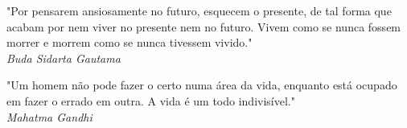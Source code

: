 \begin{titlepage}
 \vspace*{5cm}
 \begin{flushright}
  "Por pensarem ansiosamente no futuro, esquecem o presente, de tal forma que acabam por nem viver no presente nem no futuro. Vivem como se nunca fossem morrer e morrem como se nunca tivessem vivido."\\\textit{Buda Sidarta Gautama}
  \vspace{1cm}
 \end{flushright}
 
 \vspace*{5cm}
 \begin{flushright}
  "Um homem não pode fazer o certo numa área da vida, enquanto está ocupado em fazer o errado em outra. A vida é um todo indivisível."\\\textit{Mahatma Gandhi}
  \vspace{1cm}
 \end{flushright} 
\end{titlepage}



